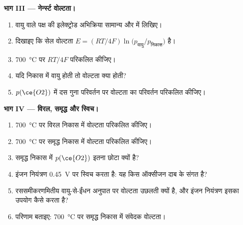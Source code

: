 \begin{problem}
\medskip\noindent\textbf{भाग III --- नेर्न्स्ट वोल्टता।}
\begin{enumerate}[resume]
  \item वायु वाले पक्ष की इलेक्ट्रोड अभिक्रिया सामान्य और
         में लिखिए।
  \item दिखाइए कि सेल वोल्टता $E = (RT/4F)\ln\bigl(p_{\text{वायु}}/p_{\text{निकास}}\bigr)$ है।
  \item \qty{700}{\celsius} पर $RT/4F$ परिकलित कीजिए।
  \item यदि निकास में वायु होती तो वोल्टता क्या होती?
  \item $p(\ce{O2})$ में दस गुना परिवर्तन पर वोल्टता का परिवर्तन परिकलित कीजिए।
\end{enumerate}

\medskip\noindent\textbf{भाग IV --- विरल, समृद्ध और स्विच।}
\begin{enumerate}[resume]
  \item \qty{700}{\celsius} पर विरल निकास में वोल्टता परिकलित कीजिए।
  \item \qty{700}{\celsius} पर समृद्ध निकास में वोल्टता परिकलित कीजिए।
  \item समृद्ध निकास में $p(\ce{O2})$ इतना छोटा क्यों है?
  \item इंजन नियंत्रण \qty{0.45}{V} पर स्विच करता है: यह किस ऑक्सीजन दाब के
        संगत है?
  \item रससमीकरणमितीय वायु-से-ईंधन अनुपात पर वोल्टता उछलती क्यों है, और इंजन नियंत्रण
        इसका उपयोग कैसे करता है?
  \item परिणाम बताइए: \qty{700}{\celsius} पर समृद्ध निकास में संवेदक वोल्टता।
\end{enumerate}
\end{problem}
